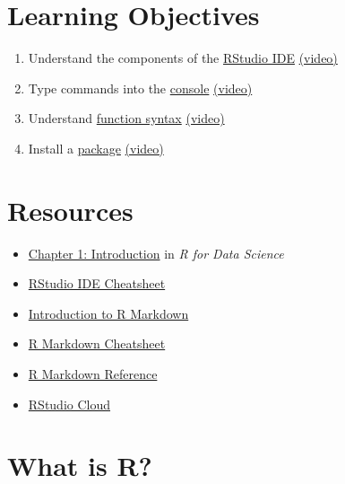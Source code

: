 \documentclass[
  oneside]{book}
\providecommand{\tightlist}{%
  \setlength{\itemsep}{0pt}\setlength{\parskip}{0pt}}
\begin{document}
\hypertarget{ilo-intro}{%
\section{Learning Objectives}\label{ilo-intro}}

\begin{enumerate}
\def\labelenumi{\arabic{enumi}.}
\tightlist
\item
  Understand the components of the \protect\hyperlink{rstudio_ide}{RStudio IDE} \href{https://youtu.be/CbA6ZVlJE78}{(video)}
\item
  Type commands into the \protect\hyperlink{console}{console} \href{https://youtu.be/wbI4c_7y0kE}{(video)}
\item
  Understand \protect\hyperlink{function_syx}{function syntax} \href{https://youtu.be/X5P038N5Q8I}{(video)}
\item
  Install a \protect\hyperlink{install-package}{package} \href{https://youtu.be/u_pvHnqkVCE}{(video)}
\end{enumerate}

\hypertarget{resources-intro}{%
\section{Resources}\label{resources-intro}}

\begin{itemize}
\tightlist
\item
  \href{http://r4ds.had.co.nz/introduction.html}{Chapter 1: Introduction} in \emph{R for Data Science}
\item
  \href{https://github.com/rstudio/cheatsheets/raw/master/rstudio-ide.pdf}{RStudio IDE Cheatsheet}
\item
  \href{https://rmarkdown.rstudio.com/lesson-1.html}{Introduction to R Markdown}
\item
  \href{https://github.com/rstudio/cheatsheets/raw/master/rmarkdown-2.0.pdf}{R Markdown Cheatsheet}
\item
  \href{https://www.rstudio.com/wp-content/uploads/2015/03/rmarkdown-reference.pdf}{R Markdown Reference}
\item
  \href{https://rstudio.cloud/}{RStudio Cloud}
\end{itemize}

\hypertarget{what-is-r}{%
\section{What is R?}\label{what-is-r}}
\end{document}
